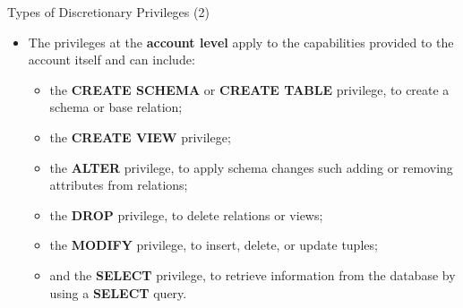 \begin{frame}{Types of Discretionary Privileges (2)}
    \Large %
    
    \begin{itemize}
        \vspace{-0.5cm} %
        
        \item The privileges at the \textbf{account level} apply to the capabilities provided to the account itself and can include:
        
        \begin{itemize}
            \large %
            \setlength{\itemsep}{0.1cm} %
            
            \item the \textbf{CREATE SCHEMA} or \textbf{CREATE TABLE} privilege, to create a schema or base relation;
            
            \item the \textbf{CREATE VIEW} privilege;
            
            \item the \textbf{ALTER} privilege, to apply schema changes such adding or removing attributes from relations;
            
            \item the \textbf{DROP} privilege, to delete relations or views;
            
            \item the \textbf{MODIFY} privilege, to insert, delete, or update tuples;
            
            \item and the \textbf{SELECT} privilege, to retrieve information from the database by using a \textbf{SELECT} query.
        \end{itemize}
        
    \end{itemize}
\end{frame}


